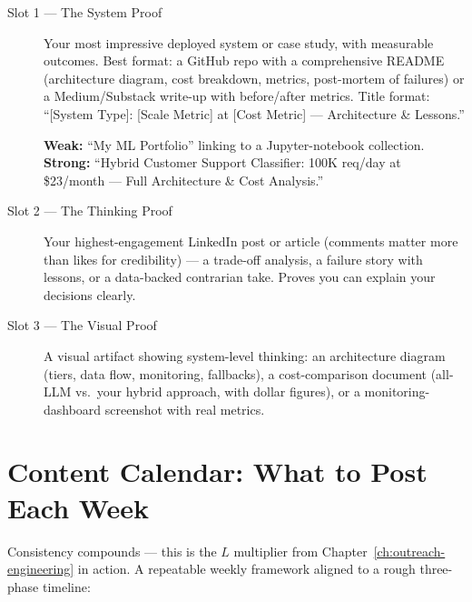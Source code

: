 \begin{description}
  \item[Slot 1 --- The System Proof] Your most impressive deployed system or case study, with measurable
  outcomes. Best format: a GitHub repo with a comprehensive README (architecture diagram, cost breakdown, metrics,
  post-mortem of failures) or a Medium/Substack write-up with before/after metrics. Title format: ``[System
  Type]: [Scale Metric] at [Cost Metric] --- Architecture \& Lessons.''
  \begin{example}
  \bad \textbf{Weak:} ``My ML Portfolio'' linking to a Jupyter-notebook collection. \\
  \good \textbf{Strong:} ``Hybrid Customer Support Classifier: 100K req/day at \$23/month --- Full Architecture
  \& Cost Analysis.''
  \end{example}
  \item[Slot 2 --- The Thinking Proof] Your highest-engagement LinkedIn post or article (comments matter more than
  likes for credibility) --- a trade-off analysis, a failure story with lessons, or a data-backed contrarian take.
  Proves you can explain your decisions clearly.
  \item[Slot 3 --- The Visual Proof] A visual artifact showing system-level thinking: an architecture diagram
  (tiers, data flow, monitoring, fallbacks), a cost-comparison document (all-LLM vs.\ your hybrid approach, with
  dollar figures), or a monitoring-dashboard screenshot with real metrics.
\end{description}

\section{Content Calendar: What to Post Each Week}
\label{sec:linkedin-content}

Consistency compounds --- this is the $L$ multiplier from Chapter~\ref{ch:outreach-engineering} in action. A
repeatable weekly framework aligned to a rough three-phase timeline:

